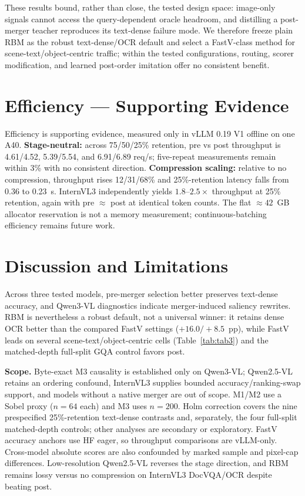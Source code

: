 \documentclass[sigconf,nonacm]{acmart}
\begin{document}
These results bound, rather than close, the tested design space: image-only
signals cannot access the query-dependent oracle headroom, and distilling a
post-merger teacher reproduces its text-dense failure mode. We therefore freeze
plain RBM as the robust text-dense/OCR default and select a FastV-class method
for scene-text/object-centric traffic; within the tested configurations,
routing, scorer modification, and learned post-order imitation offer no
consistent benefit.

\section{Efficiency --- Supporting Evidence}\label{sec:efficiency}

Efficiency is supporting evidence, measured only in vLLM 0.19 V1 offline on one
A40. \textbf{Stage-neutral:} across 75/50/25\% retention, pre vs post throughput
is 4.61/4.52, 5.39/5.54, and 6.91/6.89 req/s; five-repeat measurements remain
within 3\% with no consistent direction. \textbf{Compression scaling:} relative
to no compression, throughput rises 12/31/68\% and 25\%-retention latency falls
from 0.36 to 0.23~s. InternVL3 independently yields $1.8$--$2.5\times$ throughput
at 25\% retention, again with pre $\approx$ post at identical token counts.
The flat $\approx42$~GB allocator reservation is not a memory measurement;
continuous-batching efficiency remains future work.

\section{Discussion and Limitations}\label{sec:discussion}

Across three tested models, pre-merger selection better preserves text-dense
accuracy, and Qwen3-VL diagnostics indicate merger-induced saliency rewrites.
RBM is nevertheless a robust default, not a universal winner: it retains dense
OCR better than the compared FastV settings ($+16.0/+8.5$~pp), while FastV
leads on several scene-text/object-centric cells (Table~\ref{tab:tab3}) and the
matched-depth full-split GQA control favors post.

\textbf{Scope.} Byte-exact M3 causality is established only on Qwen3-VL;
Qwen2.5-VL retains an ordering confound, InternVL3 supplies bounded
accuracy/ranking-swap support, and models without a native merger are out of
scope. M1/M2 use a Sobel proxy ($n=64$ each) and M3 uses $n=200$. Holm correction
covers the nine prespecified 25\%-retention text-dense contrasts and, separately,
the four full-split matched-depth controls; other analyses are secondary or
exploratory. FastV accuracy anchors use HF eager, so throughput comparisons are
vLLM-only. Cross-model absolute scores are also confounded by marked sample and
pixel-cap differences. Low-resolution Qwen2.5-VL reverses the stage direction,
and RBM remains lossy versus no compression on InternVL3 DocVQA/OCR despite
beating post.
\end{document}
